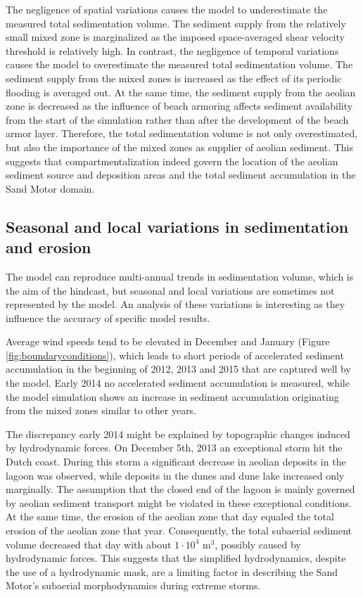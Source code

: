 \documentclass[preprint,12pt,authoryear]{elsarticle}
\begin{document}
The negligence of spatial variations causes the model to underestimate
the measured total sedimentation volume. The sediment supply from the
relatively small mixed zone is marginalized as the imposed
space-averaged shear velocity threshold is relatively high. In
contrast, the negligence of temporal variations causes the model to
overestimate the measured total sedimentation volume. The sediment
supply from the mixed zones is increased as the effect of its periodic
flooding is averaged out. At the same time, the sediment supply from
the aeolian zone is decreased as the influence of beach armoring
affects sediment availability from the start of the simulation rather
than after the development of the beach armor layer. Therefore, the
total sedimentation volume is not only overestimated, but also the
importance of the mixed zones as supplier of aeolian sediment. This
suggests that compartmentalization indeed govern the location of the
aeolian sediment source and deposition areas and the total sediment
accumulation in the Sand Motor domain.

\subsection{Seasonal and local variations in sedimentation and
  erosion}

The model can reproduce multi-annual trends in sedimentation volume,
which is the aim of the hindcast, but seasonal and local variations
are sometimes not represented by the model. An analysis of these
variations is interesting as they influence the accuracy of specific
model results.

Average wind speeds tend to be elevated in December and January
(Figure \ref{fig:boundaryconditions}), which leads to short periods of
accelerated sediment accumulation in the beginning of 2012, 2013 and
2015 that are captured well by the model. Early 2014 no accelerated
sediment accumulation is measured, while the model simulation shows an
increase in sediment accumulation originating from the mixed zones
similar to other years.

The discrepancy early 2014 might be explained by topographic changes
induced by hydrodynamic forces. On December 5th, 2013 an exceptional
storm hit the Dutch coast. During this storm a significant decrease in
aeolian deposits in the lagoon was observed, while deposits in the
dunes and dune lake increased only marginally. The assumption that the
closed end of the lagoon is mainly governed by aeolian sediment
transport might be violated in these exceptional conditions. At the
same time, the erosion of the aeolian zone that day equaled the total
erosion of the aeolian zone that year. Consequently, the total
subaerial sediment volume decreased that day with about $\mathrm{1
  \cdot 10^4}$ $\mathrm{m^3}$, possibly caused by hydrodynamic
forces. This suggests that the simplified hydrodynamics, despite the
use of a hydrodynamic mask, are a limiting factor in describing the
Sand Motor's subaerial morphodynamics during extreme storms.
\end{document}
